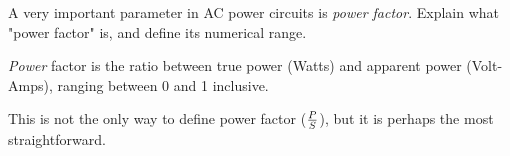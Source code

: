 

A very important parameter in AC power circuits is {\it power factor}.  Explain what "power factor" is, and define its numerical range.







{\it Power} factor is the ratio between true power (Watts) and apparent power (Volt-Amps), ranging between 0 and 1 inclusive.







This is not the only way to define power factor ($P \over S$), but it is perhaps the most straightforward.




